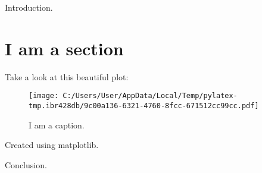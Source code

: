 \documentclass{article}%
\begin{document}
%
\normalsize%
Introduction.%
\section{I am a section}%
\label{sec:Iamasection}%
Take a look at this beautiful plot:%


\begin{figure}[htbp]%
\centering%
\texttt{[image: C:/Users/User/AppData/Local/Temp/pylatex-tmp.ibr428db/9c00a136-6321-4760-8fcc-671512cc99cc.pdf]}%
\caption{I am a caption.}%
\end{figure}

%
Created using matplotlib.

%
Conclusion.%
\end{document}
